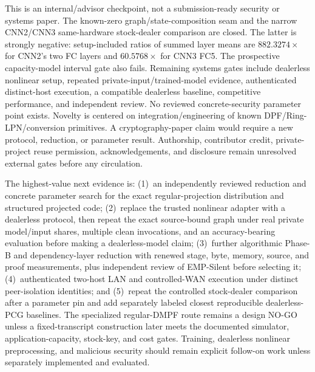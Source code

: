\documentclass[11pt]{article}
\begin{document}
This is an internal/advisor checkpoint, not a submission-ready security or
systems paper. The known-zero graph/state-composition seam and the narrow
CNN2/CNN3 same-hardware stock-dealer comparison are closed. The latter is
strongly negative: setup-included ratios of summed layer means are
$882.3274\times$ for CNN2's two FC layers and $60.5768\times$ for
CNN3 FC5. The prospective capacity-model interval gate also fails.
Remaining systems gates include
dealerless nonlinear setup, repeated private-input/trained-model evidence,
authenticated distinct-host execution, a compatible dealerless baseline,
competitive performance, and independent review. No reviewed
concrete-security parameter point exists. Novelty is centered on
integration/engineering of known DPF/Ring-LPN/conversion
primitives. A cryptography-paper claim would require a new protocol, reduction,
or parameter result. Authorship, contributor credit, private-project reuse
permission, acknowledgements, and disclosure remain unresolved external gates
before any circulation.

The highest-value next evidence is:
(1)~an independently reviewed reduction and concrete parameter search for the
exact regular-projection distribution and structured projected code;
(2)~replace the trusted nonlinear adapter with a dealerless protocol, then
repeat the exact source-bound graph under real private model/input shares,
multiple clean invocations, and an accuracy-bearing evaluation before making a
dealerless-model claim;
(3)~further algorithmic Phase-B and dependency-layer reduction with renewed
stage, byte, memory, source, and proof measurements, plus independent review of
EMP-Silent before selecting it;
(4)~authenticated two-host LAN and controlled-WAN execution under distinct
peer-isolation identities; and
(5)~repeat the controlled stock-dealer comparison after a parameter pin and add
separately labeled closest reproducible dealerless-PCG baselines. The
specialized regular-DMPF route remains a design
NO-GO unless a fixed-transcript construction later meets the documented
simulator, application-capacity, stock-key, and cost gates.
Training, dealerless nonlinear preprocessing, and malicious security should
remain explicit follow-on work unless separately implemented and evaluated.
\end{document}
